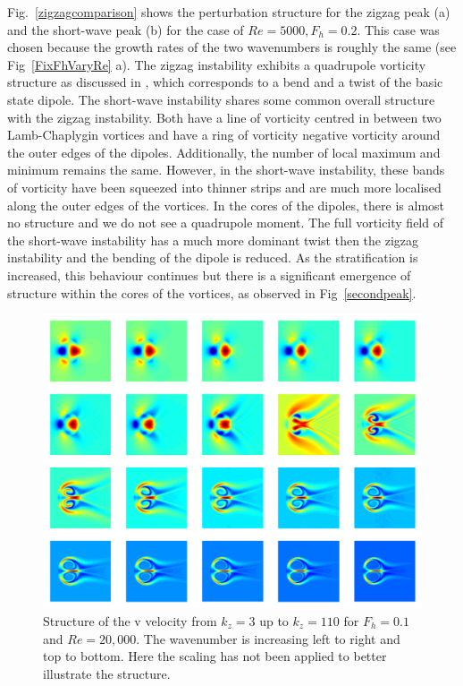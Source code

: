 Fig.~\ref{zigzagcomparison} shows the perturbation structure for the zigzag peak (a) and the short-wave peak (b) for the case of $Re=5000,F_{h}=0.2$. This case was chosen because the growth rates of the two wavenumbers is roughly the same (see Fig~\ref{FixFhVaryRe} a). The zigzag instability exhibits a quadrupole vorticity structure as discussed in \cite{bc2000c}, which corresponds to a bend and a twist of the basic state dipole. The short-wave instability shares some common overall structure with the zigzag instability. Both have a line of vorticity centred in between two Lamb-Chaplygin vortices and have a ring of vorticity negative vorticity around the outer edges of the dipoles. Additionally, the number of local maximum and minimum remains the same. However, in the short-wave instability, these bands of vorticity have been squeezed into thinner strips and are much more localised along the outer edges of the vortices. In the cores of the dipoles, there is almost no structure and we do not see a quadrupole moment. The full vorticity field of the short-wave instability has a much more dominant twist then the zigzag instability and the bending of the dipole is reduced. As the stratification is increased, this behaviour continues but there is a significant emergence of structure within the cores of the vortices, as observed in Fig~\ref{secondpeak}.


\begin{figure}
\begin{center}
\includegraphics[width=\textwidth]{velocity_field_evolution_u_fh_01_re_20000}
\caption{Structure of the v velocity from $k_{z}=3$ up to $k_{z}=110$ for $F_{h}=0.1$ and $Re=20{,}000$. The wavenumber is increasing left to right and top to bottom. Here the scaling has not been applied to better illustrate the structure.}
\label{evolution}
\end{center}
\end{figure}


